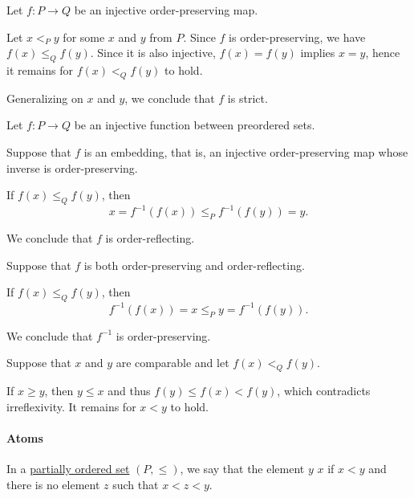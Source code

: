 \begin{defproof}
   Let \( f: P \to Q \) be an injective order-preserving map.

  Let \( x <_P y \) for some \( x \) and \( y \) from \( P \). Since \( f \) is order-preserving, we have \( f(x) \leq_Q f(y) \). Since it is also injective, \( f(x) = f(y) \) implies \( x = y \), hence it remains for \( f(x) <_Q f(y) \) to hold.

  Generalizing on \( x \) and \( y \), we conclude that \( f \) is strict.

   Let \( f: P \to Q \) be an injective function between preordered sets.

  \SufficiencySubProof* Suppose that \( f \) is an embedding, that is, an injective order-preserving map whose inverse is order-preserving.

  If \( f(x) \leq_Q f(y) \), then
  \begin{equation*}
    x = f^{-1}(f(x)) \leq_P f^{-1}(f(y)) = y.
  \end{equation*}

  We conclude that \( f \) is order-reflecting.

  \NecessitySubProof* Suppose that \( f \) is both order-preserving and order-reflecting.

  If \( f(x) \leq_Q f(y) \), then
  \begin{equation*}
    f^{-1}(f(x)) = x \leq_P y = f^{-1}(f(y)).
  \end{equation*}

  We conclude that \( f^{-1} \) is order-preserving.

   Suppose that \( x \) and \( y \) are comparable and let \( f(x) <_Q f(y) \).

  If \( x \geq y \), then \( y \leq x \) and thus \( f(y) \leq f(x) < f(y) \), which contradicts irreflexivity. It remains for \( x < y \) to hold.
\end{defproof}

\paragraph{Atoms}

\begin{definition}\label{def:partial_order_covering}
  In a \hyperref[def:partially_ordered_set]{partially ordered set} \( (P, \leq) \), we say that the element \( y \)  \( x \) if \( x < y \) and there is no element \( z \) such that \( x < z < y \).
\end{definition}

